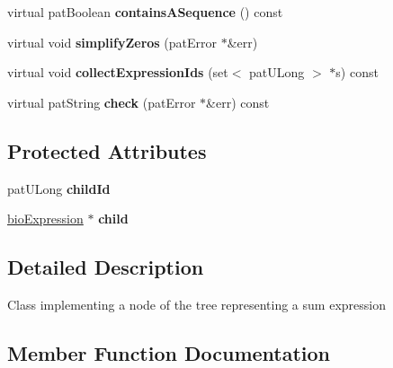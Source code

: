 \begin{DoxyCompactItemize}
virtual pat\+Boolean {\bfseries contains\+A\+Sequence} () const
\item 
\mbox{\label{classbio_arith_unary_expression_a67153c2ecbab06a404d52fed92047fad}} 
virtual void {\bfseries simplify\+Zeros} (pat\+Error $\ast$\&err)
\item 
\mbox{\label{classbio_arith_unary_expression_a158beb11790272f8cd9438afe3b78ff2}} 
virtual void {\bfseries collect\+Expression\+Ids} (set$<$ pat\+U\+Long $>$ $\ast$s) const
\item 
\mbox{\label{classbio_arith_unary_expression_a73cf4b2ffae2bd9af88ec72ec76c2043}} 
virtual pat\+String {\bfseries check} (pat\+Error $\ast$\&err) const
\end{DoxyCompactItemize}
\subsection*{Protected Attributes}
\begin{DoxyCompactItemize}
\item 
\mbox{\label{classbio_arith_unary_expression_ad83897e3f655f2c25e603cc50249ac3a}} 
pat\+U\+Long {\bfseries child\+Id}
\item 
\mbox{\label{classbio_arith_unary_expression_a654eeff5056aaab7bfc8dd825feeeb6b}} 
\hyperlink{classbio_expression}{bio\+Expression} $\ast$ {\bfseries child}
\end{DoxyCompactItemize}


\subsection{Detailed Description}
Class implementing a node of the tree representing a sum expression 

\subsection{Member Function Documentation}
\mbox{\label{classbio_arith_unary_expression_a974b7779804861f331a75e08db377926}} 
